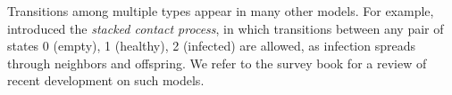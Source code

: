 \documentclass{article}
\renewcommand{\P}{\mathbb{P}}
\newcommand{\bZ}{{\mathbb Z}}
\numberwithin{equation}{section}
\begin{document}
Transitions among multiple types appear in many other models.
For example, %
\cite{CourtBlytheAllen} introduced the {\it stacked contact process\/}, in which transitions between any pair of states 0 (empty), 1 (healthy), 2 (infected) are allowed, as infection spreads through neighbors and offspring. We refer to 
the survey book \cite{Lanchier} for a review of recent development on such models.




\end{document}
